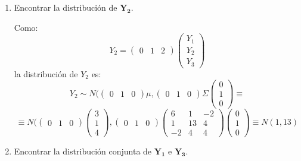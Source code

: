 \documentclass[11pt,a4paper]{article}
\begin{document}
\begin{enumerate}[label=\arabic*.]
\begin{enumerate}[label=\arabic*)]
\bfseries
\vspace{1cm}
\item Encontrar la distribución de $\mathbf{Y_{2}}$.
\vspace{0.5cm}
\normalfont

Como:
$$Y_{2} = \begin{pmatrix} 0 & 1 & 2 \end{pmatrix} \begin{pmatrix} Y_{1} \\ Y_{2} \\ Y_{3} \end{pmatrix}$$
la distribución de $Y_{2}$ es:
$$Y_{2} \sim N(\begin{pmatrix} 0 & 1 & 0 \end{pmatrix} \mu, \begin{pmatrix} 0 & 1 & 0 \end{pmatrix} \Sigma \begin{pmatrix} 0 \\ 1 \\ 0 \end{pmatrix} \equiv$$
$$\equiv N(\begin{pmatrix} 0 & 1 & 0 \end{pmatrix} \begin{pmatrix} 3 \\ 1 \\ 4 \end{pmatrix}, \begin{pmatrix} 0 & 1 & 0 \end{pmatrix} \begin{pmatrix}
6 & 1 & -2 \\
1 & 13 & 4 \\
-2 & 4 & 4
\end{pmatrix} \begin{pmatrix} 0 \\ 1 \\ 0 \end{pmatrix} \equiv N(1, 13)$$

\bfseries
\vspace{1cm}
\item Encontrar la distribución conjunta de $\mathbf{Y_{1}}$ e $\mathbf{Y_{3}}$.
\vspace{0.5cm}
\normalfont


\end{enumerate}
\end{enumerate}
\end{document}
